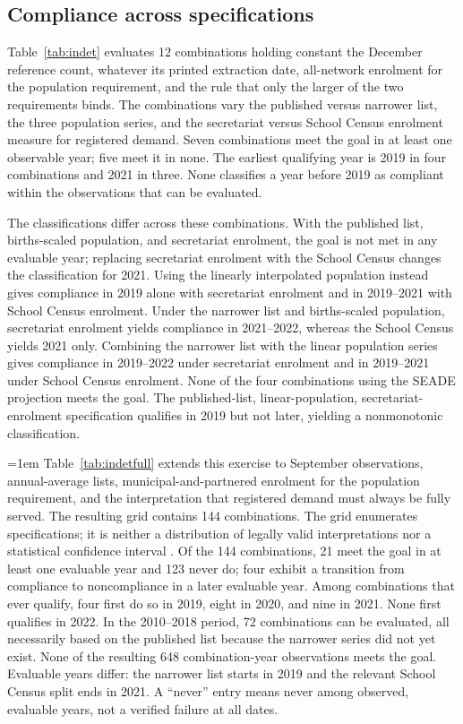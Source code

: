 \subsection{Compliance across specifications}

Table~\ref{tab:indet} evaluates 12 combinations holding constant the December reference count, whatever its printed extraction date, all-network enrolment for the population requirement, and the rule that only the larger of the two requirements binds. The combinations vary the published versus narrower list, the three population series, and the secretariat versus School Census enrolment measure for registered demand. Seven combinations meet the goal in at least one observable year; five meet it in none. The earliest qualifying year is 2019 in four combinations and 2021 in three. None classifies a year before 2019 as compliant within the observations that can be evaluated.

The classifications differ across these combinations. With the published list, births-scaled population, and secretariat enrolment, the goal is not met in any evaluable year; replacing secretariat enrolment with the School Census changes the classification for 2021. Using the linearly interpolated population instead gives compliance in 2019 alone with secretariat enrolment and in 2019--2021 with School Census enrolment. Under the narrower list and births-scaled population, secretariat enrolment yields compliance in 2021--2022, whereas the School Census yields 2021 only. Combining the narrower list with the linear population series gives compliance in 2019--2022 under secretariat enrolment and in 2019--2021 under School Census enrolment. None of the four combinations using the SEADE projection meets the goal. The published-list, linear-population, secretariat-enrolment specification qualifies in 2019 but not later, yielding a nonmonotonic classification.

{\emergencystretch=1em Table~\ref{tab:indetfull} extends this exercise to September observations, annual-average lists, municipal-and-partnered enrolment for the population requirement, and the interpretation that registered demand must always be fully served. The resulting grid contains 144 combinations. The grid enumerates specifications; it is neither a distribution of legally valid interpretations nor a statistical confidence interval \citep{steegen2016increasing,simonsohn2020specification}. Of the 144 combinations, 21 meet the goal in at least one evaluable year and 123 never do; four exhibit a transition from compliance to noncompliance in a later evaluable year. Among combinations that ever qualify, four first do so in 2019, eight in 2020, and nine in 2021. None first qualifies in 2022. In the 2010--2018 period, 72 combinations can be evaluated, all necessarily based on the published list because the narrower series did not yet exist. None of the resulting 648 combination-year observations meets the goal. Evaluable years differ: the narrower list starts in 2019 and the relevant School Census split ends in 2021. A ``never'' entry means never among observed, evaluable years, not a verified failure at all dates.\par}

